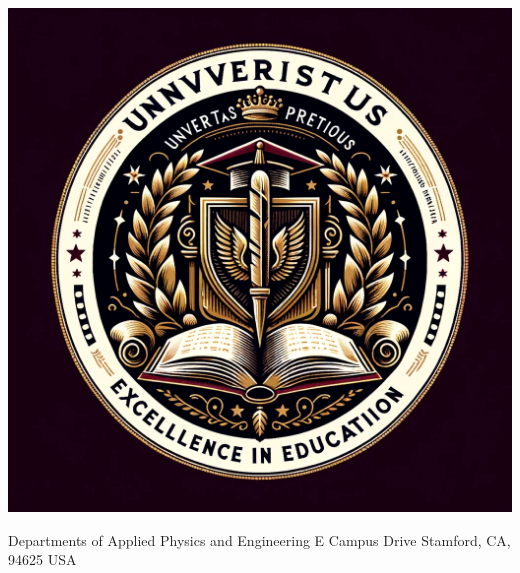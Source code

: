 \documentclass[11pt]{article}
\newcommand{\mybullet}{\textbullet\hspace{0.5em}}
\begin{document}
\noindent
\begin{minipage}[t]{0.15\textwidth}
\vspace*{-2.8cm} %
\includegraphics[width=\linewidth]{logos/DALLE_logo.png} %
\end{minipage}
\hfill
\begin{minipage}[t]{0.6\textwidth}
\vspace*{-2.2cm} %
{\color{black} Departments of Applied Physics and Engineering\color{mygray}\small{} E Campus Drive \mybullet Stamford, CA, 94625 \mybullet USA} %
\end{minipage}

\vspace{0.5cm} %
\end{document}
